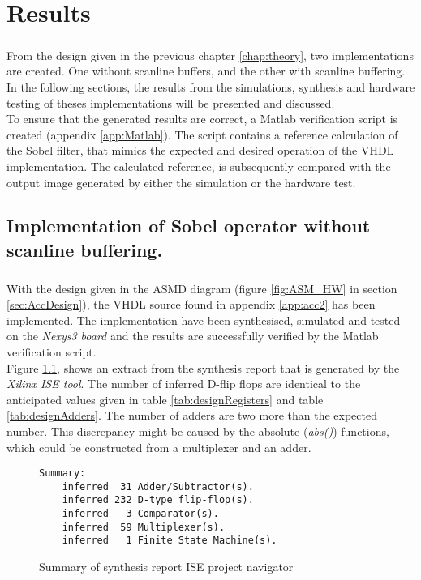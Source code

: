 \chapter{Results}
\label{chap:Results}
\paragraph*{}
From the design given in the previous chapter \ref{chap:theory}, two implementations are created. One without scanline buffers, and the other with scanline buffering. In the following sections, the results from the simulations, synthesis and hardware testing of theses implementations will be presented and discussed.  \\
To ensure that the generated results are correct, a Matlab verification script is created (appendix \ref{app:Matlab}). The script contains a reference calculation of the Sobel filter, that mimics the expected and desired operation of the VHDL implementation.
The calculated reference, is subsequently compared with the output image generated by either the simulation or the hardware test.

\section{Implementation of Sobel operator without scanline buffering.}
\paragraph*{}
With the design given in the ASMD diagram (figure \ref{fig:ASM_HW} in section \ref{sec:AccDesign}), the VHDL source found in appendix \ref{app:acc2} has been implemented. The implementation have been synthesised, simulated and tested on the \textit{Nexys3 board} and the results are successfully verified by the Matlab verification script.\\
Figure \ref{fig:sum_synthesis_report}, shows an extract from the synthesis report that is generated by the \textit{Xilinx  ISE tool}. The number of inferred D-flip flops are identical to the anticipated values given in table  \ref{tab:designRegisters} and table \ref{tab:designAdders}. The number of adders are two more than the expected number. This discrepancy might be caused by the absolute (\textit{abs()}) functions, which could be constructed from a multiplexer and an adder. 

\begin{figure}[H]
\centering
\small
\begin{BVerbatim}
Summary:
    inferred  31 Adder/Subtractor(s).
    inferred 232 D-type flip-flop(s).
    inferred   3 Comparator(s).
    inferred  59 Multiplexer(s).
    inferred   1 Finite State Machine(s).
\end{BVerbatim}
\caption{Summary of synthesis report ISE project navigator}
\label{fig:sum_synthesis_report}
\end{figure}


